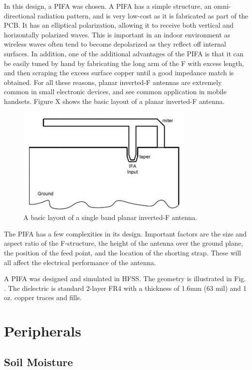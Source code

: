 In this design, a PIFA was chosen. A PIFA has a simple structure, an omni-directional radiation pattern, and is very low-cost as it is fabricated as part of the PCB. It has an elliptical polarization, allowing it to receive both vertical and horizontally polarized waves\cite{huynh2000numerical}. This is important in an indoor environment as wireless waves often tend to become depolarized as they reflect off internal surfaces. In addition, one of the additional advantages of the PIFA is that it can be easily tuned by hand by fabricating the long arm of the F with excess length, and then scraping the excess surface copper until a good impedance match is obtained. For all these reasons, planar inverted-F antennas are extremely common in small electronic devices, and see common application in mobile handsets. Figure X shows the basic layout of a planar inverted-F antenna.

\begin{figure}[h]
\centering
\includegraphics[width=0.5\linewidth]{images/pifa}
\caption[PIFA Layout]{A basic layout of a single band planar inverted-F antenna\cite{Rosu}.}
\label{fig:pifa}
\end{figure}


The PIFA has a few complexities in its design. Important factors are the size and aspect ratio of the F-structure, the height of the antenna over the ground plane, the position of the feed point, and the location of the shorting strap. These will all affect the electrical performance of the antenna.

A PIFA was designed and simulated in HFSS. The geometry is illustrated in Fig. . The dielectric is standard 2-layer FR4 with a thickness of 1.6mm (63 mil) and 1 oz. copper traces and fills.

\section{Peripherals}
\subsection{Soil Moisture}
